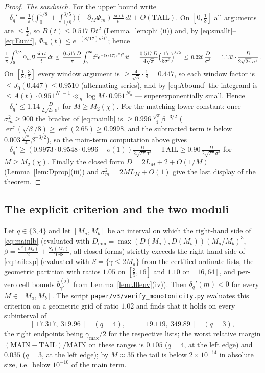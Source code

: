 \begin{proof}
\emph{The sandwich.} For the upper bound write
$-\delta_q'=\frac1\pi\bigl(\int_0^{1/8}+\int_{1/8}^{3/5}\bigr)
(-\partial_M\Phi_m)\frac{\sin t}t\,dt+O(\mathrm{TAIL})$. On
$[0,\tfrac18]$ all arguments are $\le\tfrac12$, so
$B(t)\le0.517\,Dt^2$ (Lemma~\ref{lem:phi}(ii)) and, by
\eqref{eq:smallt}--\eqref{eq:Eunif},
$\Phi_m(t)\le e^{-(8/17)\sigma^2t^2}$; hence
\[
\frac1\pi\int_0^{1/8}\Phi_mB\,\frac{\sin t}t\,dt
\;\le\;\frac{0.517\,D}\pi\int_0^\infty t^2e^{-(8/17)\sigma^2t^2}dt
\;=\;\frac{0.517\,D}{4\sqrt\pi}
\Bigl(\frac{17}{8\sigma^2}\Bigr)^{3/2}
\;\le\;0.226\,\frac D{\sigma^3}\;=\;1.133\cdot
\frac D{2\sqrt{2\pi}\,\sigma^3}\,.
\]
On $[\tfrac18,\tfrac35]$ every window argument is
$\ge\tfrac4{\sqrt5}\cdot\tfrac18=0.447$, so each window factor is
$\le J_0(0.447)\le0.9510$ (alternating series), and by
\eqref{eq:Abound} the integrand is
$\le A(t)\cdot0.951^{\,N_0-1}\ll_q\log M\cdot0.951^{\,N_0}$ ---
superexponentially small. Hence
$-\delta_q'\le1.14\,\frac D{2\sqrt{2\pi}\sigma^3}$ for
$M\ge M_2(\chi)$. For the matching lower constant: once
$\sigma_m^2\ge900$ the bracket of \eqref{eq:mainlb} is
$\ge0.996\,\tfrac{\sqrt\pi}4\beta^{-3/2}$
($\operatorname{erf}(\sqrt\beta/8)\ge\operatorname{erf}(2.65)
\ge0.9998$, and the subtracted term is below
$0.003\,\tfrac{\sqrt\pi}4\beta^{-3/2}$), so the main-term
computation above gives
$-\delta_q'\ge(0.9973\cdot0.9548\cdot0.996-o(1))
\frac D{2\sqrt{2\pi}\sigma^3}-\mathrm{TAIL}
\ge0.90\,\frac D{2\sqrt{2\pi}\sigma^3}$ for $M\ge M_2(\chi)$.
Finally the closed form $D=2L_M+2+O(1/M)$
(Lemma~\ref{lem:Dprop}(iii)) and
$\sigma_m^2=2ML_M+O(1)$ give the last display of the theorem.
\end{proof}

\subsection*{The explicit criterion and the two moduli}

\begin{proposition}[evaluated criterion, $q=4$ and $q=3$]
\label{prop:criterion-eval}
Let $q\in\{3,4\}$ and let $[M_a,M_b]$ be an interval on which the
right-hand side of \eqref{eq:mainlb} (evaluated with
$D_{\min}=\max(D(M_a),D(M_b))(M_a/M_b)^3$,
$\beta=\tfrac{\sigma^2(M_b)}2+\tfrac{S_4(M_b)}{1088}$, all closed
forms) strictly exceeds the right-hand side of \eqref{eq:tailexp}
(evaluated with $S=\{\gamma\le2M_a\}$ from the certified ordinate
lists, the geometric partition with ratios $1.05$ on
$[\tfrac35,16]$ and $1.10$ on $[16,64]$, and per-zero cell bounds
$b^{(j)}_{\gamma'}$ from Lemma~\ref{lem:J0env}(iv)). Then
$\delta_q'(m)<0$ for every $M\in[M_a,M_b]$. The script
\texttt{paper/v3/verify\_monotonicity.py} evaluates this criterion on
a geometric grid of ratio $1.02$ and finds that it holds on every
subinterval of
\[
[\,17.317,\ 319.96\,]\quad(q=4),
\qquad
[\,19.119,\ 349.89\,]\quad(q=3),
\]
the right endpoints being $\gamma_{\max}/2$ for the respective lists;
the worst relative margin
$(\mathrm{MAIN}-\mathrm{TAIL})/\mathrm{MAIN}$ on these ranges is
$0.105$ ($q=4$, at the left edge) and $0.035$ ($q=3$, at the left
edge); by $M\approx35$ the tail is below $2\times10^{-14}$ in
absolute size, i.e.\ below $10^{-10}$ of the main term.
\end{proposition}

